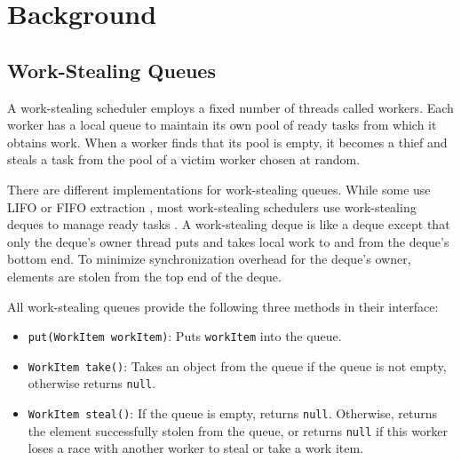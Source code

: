 
\chapter{Background}
\label{chap:queues-background}

\section{Work-Stealing Queues}
\label{sec:queues-background-work-stealing-queues}

A work-stealing scheduler employs a fixed number of threads called
workers. Each worker has a local queue to maintain its own pool of
ready tasks from which it obtains work. When a worker finds that its
pool is empty, it becomes a thief and steals a task from the pool of a
victim worker chosen at random.

There are different implementations for work-stealing queues. While
some use LIFO or FIFO extraction \cite{Michael2009}, most
work-stealing schedulers use work-stealing deques to manage ready
tasks \cite{Arora2001, Acar2002, Blumofe1995, Frigo1998,
  Danaher2005}. A work-stealing deque is like a deque \cite{Knuth1997}
except that only the deque's owner thread puts and takes local work to
and from the deque's bottom end. To minimize synchronization overhead
for the deque's owner, elements are stolen from the top end of the
deque.

All work-stealing queues provide the following three methods in their
interface:

\begin{itemize}
\item \lstinline!put(WorkItem workItem)!: Puts \lstinline!workItem!
  into the queue.
\item \lstinline!WorkItem take()!: Takes an object from the queue if
  the queue is not empty, otherwise returns \lstinline!null!.
\item \lstinline!WorkItem steal()!: If the queue is empty, returns
  \lstinline!null!. Otherwise, returns the element successfully stolen
  from the queue, or returns \lstinline!null! if this worker loses a
  race with another worker to steal or take a work item.
\end{itemize}



